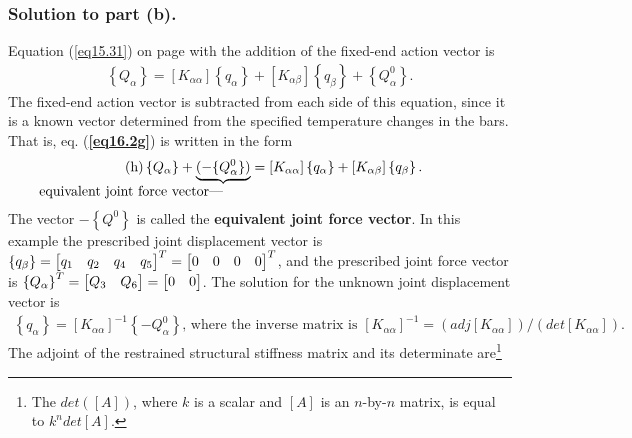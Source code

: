 \documentclass{AeroStructure-ERJohnson}
\begin{document}
\begin{example}
\subsubsection{Solution to part (b).} Equation (\ref{eq15.31}) on page \pageref{eq15.31} with the addition of the fixed-end action vector is
\begin{align}\label{eq16.2g}\tag{g}
\left\{Q_{\alpha}\right\}=\left[K_{\alpha \alpha}\right]\left\{q_{\alpha}\right\}+\left[K_{\alpha \beta}\right]\left\{q_{\beta}\right\}+\left\{Q_{\alpha}^{0}\right\}.
\end{align}
The fixed-end action vector is subtracted from each side of this equation, since it is a known vector determined from the specified temperature changes in the bars. That is, eq. (\textbf{\ref{eq16.2g}}) is written in the form
\begin{align}\label{eq16.2h}\tag{h}
\left\{Q_{\alpha}\right\}+\underbrace{(-\{Q_{\alpha}^{0}\})}_{\hspace*{-11pc}\mbox{equivalent joint force vector---}}=\left[K_{\alpha \alpha}\right]\left\{q_{\alpha}\right\}+\left[K_{\alpha \beta}\right]\left\{q_{\beta}\right\}.
\end{align}
The vector $-\left\{Q^{0}\right\}$ is called the \textbf{equivalent joint force vector}. In this example the prescribed joint displacement vector is $\left\{q_{\beta}\right\}=\left[\begin{array}{@{}llll@{}}q_{1} & q_{2} & q_{4} & q_{5}\end{array}\right]^{T}=\left[\begin{array}{@{}llll@{}}0 & 0 & 0 & 0\end{array}\right]^{T}$, and the prescribed joint force vector is $\left\{Q_{\alpha}\right\}^{T}=\left[\begin{array}{@{}ll@{}}Q_{3} & Q_{6}\end{array}\right]=\left[\begin{array}{@{}ll@{}}0 & 0\end{array}\right]$. The solution for the unknown joint displacement vector is
\begin{align}\label{eq16.2i}\tag{i}
\left\{q_{\alpha}\right\}=\left[K_{\alpha \alpha}\right]^{-1}\left\{-Q_{\alpha}^{0}\right\}\mbox{, where the inverse matrix is }\left[K_{\alpha \alpha}\right]^{-1}=\left(a d j\left[K_{\alpha \alpha}\right]\right) /\left({det}\left[K_{\alpha \alpha}\right]\right).
\end{align}
The adjoint of the restrained structural stiffness matrix and its determinate are\footnote{The $det([A])$, where $k$ is a scalar and $[A]$ is an $n$-by-$n$ matrix, is equal to $k^n det[A]$.}

\end{example}
\end{document}
